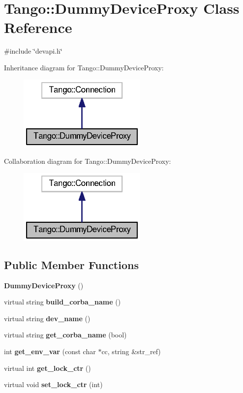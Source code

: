 \section{Tango\-:\-:Dummy\-Device\-Proxy Class Reference}
\label{classTango_1_1DummyDeviceProxy}


{\ttfamily \#include \char`\"{}devapi.\-h\char`\"{}}



Inheritance diagram for Tango\-:\-:Dummy\-Device\-Proxy\-:
\nopagebreak
\begin{figure}[H]
\begin{center}
\leavevmode
\includegraphics[width=178pt]{da/df5/classTango_1_1DummyDeviceProxy__inherit__graph}
\end{center}
\end{figure}


Collaboration diagram for Tango\-:\-:Dummy\-Device\-Proxy\-:
\nopagebreak
\begin{figure}[H]
\begin{center}
\leavevmode
\includegraphics[width=178pt]{d1/d9a/classTango_1_1DummyDeviceProxy__coll__graph}
\end{center}
\end{figure}
\subsection*{Public Member Functions}
\begin{DoxyCompactItemize}
\item 
{\bf Dummy\-Device\-Proxy} ()
\item 
virtual string {\bf build\-\_\-corba\-\_\-name} ()
\item 
virtual string {\bf dev\-\_\-name} ()
\item 
virtual string {\bf get\-\_\-corba\-\_\-name} (bool)
\item 
int {\bf get\-\_\-env\-\_\-var} (const char $\ast$cc, string \&str\-\_\-ref)
\item 
virtual int {\bf get\-\_\-lock\-\_\-ctr} ()
\item 
virtual void {\bf set\-\_\-lock\-\_\-ctr} (int)
\end{DoxyCompactItemize}


